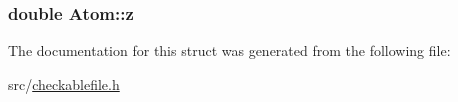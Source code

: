 \subsubsection[{z}]{\setlength{\rightskip}{0pt plus 5cm}double Atom\+::z}\label{struct_atom_af1c8b6cd65e2a489b9be339efd7a77ac}


The documentation for this struct was generated from the following file\+:\begin{DoxyCompactItemize}
\item 
src/\hyperlink{checkablefile_8h}{checkablefile.\+h}\end{DoxyCompactItemize}
